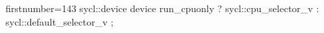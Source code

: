 \begin{cppcode*}{firstnumber=143}
        sycl::device device { run_cpuonly ? sycl::cpu_selector_v : sycl::default_selector_v };
\end{cppcode*}

